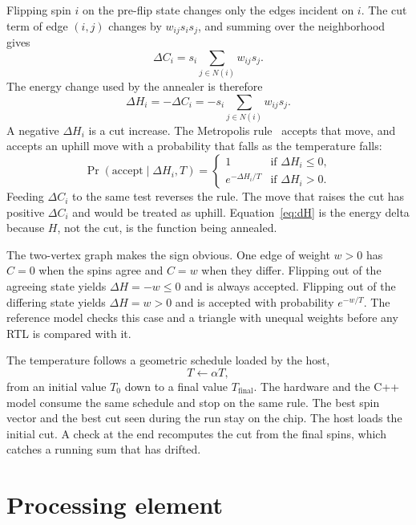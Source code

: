 \documentclass[10pt,twocolumn]{article}
\begin{document}
Flipping spin \(i\) on the pre-flip state changes only the edges incident on \(i\).
The cut term of edge \((i,j)\) changes by \(w_{ij}s_i s_j\), and summing over the neighborhood gives
\begin{equation}
\Delta C_i = s_i\sum_{j\in N(i)} w_{ij}s_j.
\label{eq:dcut}
\end{equation}
The energy change used by the annealer is therefore
\begin{equation}
\Delta H_i = -\Delta C_i = -s_i\sum_{j\in N(i)} w_{ij}s_j.
\label{eq:dH}
\end{equation}
A negative \(\Delta H_i\) is a cut increase.
The Metropolis rule~\citep{metropolis1953} accepts that move, and accepts an uphill move with a probability that falls as the temperature falls:
\begin{equation}
\Pr(\mathrm{accept}\mid \Delta H_i,T)=
\begin{cases}
1 & \text{if }\Delta H_i\le 0,\\[2pt]
e^{-\Delta H_i/T} & \text{if }\Delta H_i>0.
\end{cases}
\label{eq:metro}
\end{equation}
Feeding \(\Delta C_i\) to the same test reverses the rule.
The move that raises the cut has positive \(\Delta C_i\) and would be treated as uphill.
Equation~\eqref{eq:dH} is the energy delta because \(H\), not the cut, is the function being annealed.

The two-vertex graph makes the sign obvious.
One edge of weight \(w>0\) has \(C=0\) when the spins agree and \(C=w\) when they differ.
Flipping out of the agreeing state yields \(\Delta H=-w\le 0\) and is always accepted.
Flipping out of the differing state yields \(\Delta H=w>0\) and is accepted with probability \(e^{-w/T}\).
The reference model checks this case and a triangle with unequal weights before any RTL is compared with it.

The temperature follows a geometric schedule loaded by the host,
\begin{equation}
T\leftarrow \alpha T,
\label{eq:schedule}
\end{equation}
from an initial value \(T_0\) down to a final value \(T_{\mathrm{final}}\).
The hardware and the C++ model consume the same schedule and stop on the same rule.
The best spin vector and the best cut seen during the run stay on the chip.
The host loads the initial cut.
A check at the end recomputes the cut from the final spins, which catches a running sum that has drifted.

\section{Processing element}
\label{sec:pe}
\end{document}
